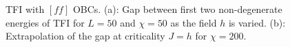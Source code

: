 	\begin{figure}[h!]
		\hspace{-0.5cm}
		\quad
		\caption{TFI with $[ff]$ OBCs. (a): Gap between first two non-degenerate energies of TFI for $L=50$ and $\chi=50$ as the field $h$ is varied. (b): Extrapolation of the gap at criticality $J=h$ for $\chi=200$.}
		\label{fig:gapsTFI}
	\end{figure}

